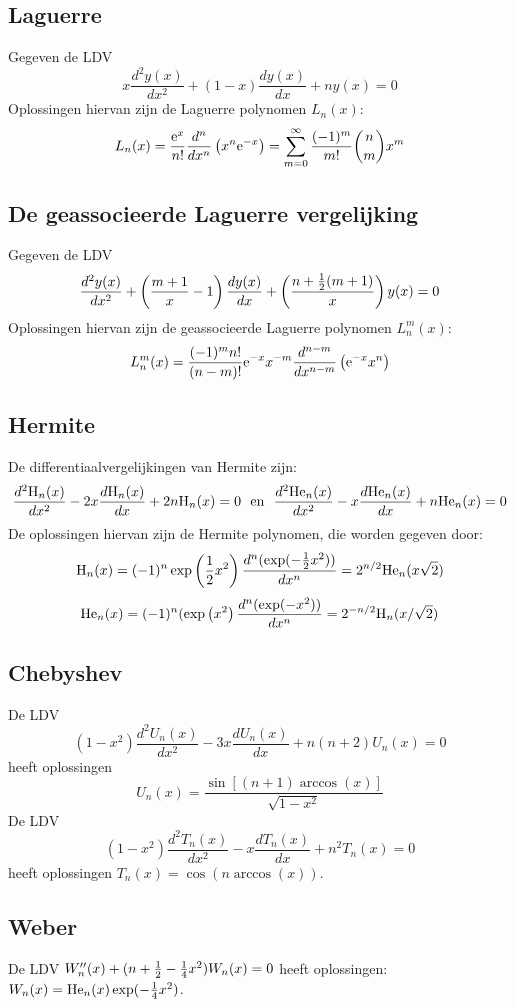 \documentclass[twoside]{report}
\begin{document}
\subsection{Laguerre}
Gegeven de LDV
\[
x\frac{d^2y(x)}{dx^2}+(1-x)\frac{dy(x)}{dx}+ny(x)=0
\]
Oplossingen hiervan zijn de Laguerre polynomen $L_n(x)$:
\[
L_n(x)=\frac{{\rm e}^x}{n!}\frac{d^n}{dx^n}\left(x^n{\rm e}^{-x}\right)=
\sum_{m=0}^\infty\frac{(-1)^m}{m!}{n\choose m}x^m
\]

\subsection{De geassocieerde Laguerre vergelijking}
Gegeven de LDV
\[
\frac{d^2y(x)}{dx^2}+\left(\frac{m+1}{x}-1\right)\frac{dy(x)}{dx}+\left(\frac{n+\mbox{$\frac{1}{2}$}(m+1)}{x}\right)y(x)=0
\]
Oplossingen hiervan zijn de geassocieerde Laguerre polynomen $L_n^m(x)$:
\[
L_n^m(x)=\frac{(-1)^mn!}{(n-m)!}{\rm e}^{-x}x^{-m}\frac{d^{n-m}}{dx^{n-m}}\left({\rm e}^{-x}x^n\right)
\]

\subsection{Hermite}
\def\Hn{{\rm H}_n}
\def\Hen{{\rm He}_n}
De differentiaalvergelijkingen van Hermite zijn:
\[
\frac{d^2\Hn(x)}{dx^2}-2x\frac{d\Hn(x)}{dx}+2n\Hn(x)=0~~\mbox{en}~~
\frac{d^2\Hen(x)}{dx^2}-x\frac{d\Hen(x)}{dx}+n\Hen(x)=0
\]
De oplossingen hiervan zijn de Hermite polynomen, die worden gegeven door:
\[
\Hn(x)=(-1)^n\exp\left(\frac{1}{2}x^2\right)\frac{d^n(\exp(-\half x^2))}{dx^n}=2^{n/2}\Hen(x\sqrt{2})
\]
\[
\Hen(x)=(-1)^n(\exp\left(x^2\right)\frac{d^n(\exp(-x^2))}{dx^n}=2^{-n/2}\Hn(x/\sqrt{2})
\]

\subsection{Chebyshev}
De LDV
\[
(1-x^2)\frac{d^2U_n(x)}{dx^2}-3x\frac{dU_n(x)}{dx}+n(n+2)U_n(x)=0
\]
heeft oplossingen
\[
U_n(x)=\frac{\sin[(n+1)\arccos(x)]}{\sqrt{1-x^2}}
\]
De LDV
\[
(1-x^2)\frac{d^2T_n(x)}{dx^2}-x\frac{dT_n(x)}{dx}+n^2T_n(x)=0
\]
heeft oplossingen $T_n(x)=\cos(n\arccos(x))$.

\subsection{Weber}
De LDV $W''_n(x)+(n+\mbox{$\frac{1}{2}$}-\mbox{$\frac{1}{4}$} x^2)W_n(x)=0$ heeft oplossingen:
$W_n(x)={\rm He}_n(x)\exp(-\mbox{$\frac{1}{4}$} x^2)$.
\end{document}
